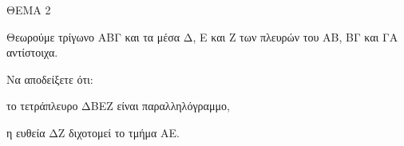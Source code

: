 
ΘΕΜΑ 2

Θεωρούμε τρίγωνο ΑΒΓ και τα μέσα Δ, Ε και Ζ των πλευρών του ΑΒ, ΒΓ και ΓΑ αντίστοιχα.

Να αποδείξετε ότι:

\begin{alist}
\item το τετράπλευρο ΔΒΕΖ είναι παραλληλόγραμμο, 

\item η ευθεία ΔΖ διχοτομεί το τμήμα ΑΕ. 
\end{alist}
